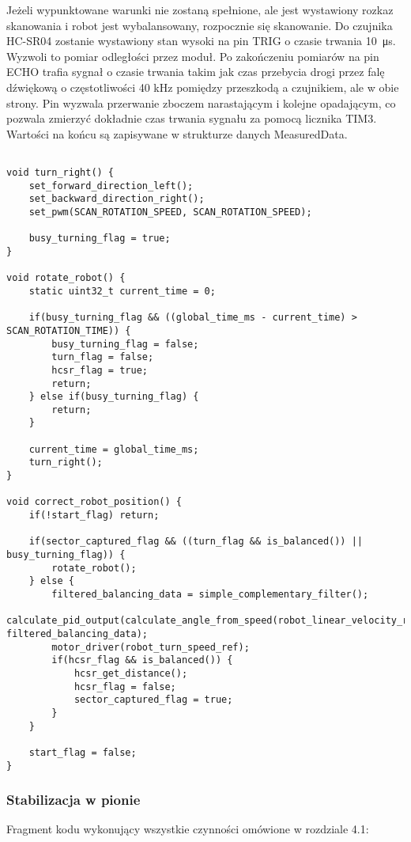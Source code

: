 \documentclass[a4paper,12pt,twoside,openany]{report}
\begin{document}
Jeżeli wypunktowane warunki nie zostaną spełnione, ale jest wystawiony rozkaz skanowania i robot jest wybalansowany, rozpocznie się skanowanie. Do czujnika HC-SR04 zostanie wystawiony stan wysoki na pin TRIG o czasie trwania \SI{10}{\micro s}. Wyzwoli to pomiar odległości przez moduł. Po zakończeniu pomiarów na pin ECHO trafia sygnał o czasie trwania takim jak czas przebycia drogi przez falę dźwiękową o częstotliwości 40 kHz pomiędzy przeszkodą a czujnikiem, ale w obie strony. Pin wyzwala przerwanie zboczem narastającym i kolejne opadającym, co pozwala zmierzyć dokładnie czas trwania sygnału za pomocą licznika TIM3. Wartości na końcu są zapisywane w strukturze danych MeasuredData.

\begin{lstlisting}[style=customc]

void turn_right() {
	set_forward_direction_left();
	set_backward_direction_right();
	set_pwm(SCAN_ROTATION_SPEED, SCAN_ROTATION_SPEED);

	busy_turning_flag = true;
}

void rotate_robot() {
	static uint32_t current_time = 0;

	if(busy_turning_flag && ((global_time_ms - current_time) > SCAN_ROTATION_TIME)) {
		busy_turning_flag = false;
		turn_flag = false;
		hcsr_flag = true;
		return;
	} else if(busy_turning_flag) {
		return;
	}

	current_time = global_time_ms;
	turn_right();
}

void correct_robot_position() {
	if(!start_flag) return;
	
	if(sector_captured_flag && ((turn_flag && is_balanced()) || busy_turning_flag)) {
		rotate_robot();
	} else {
		filtered_balancing_data = simple_complementary_filter();
		calculate_pid_output(calculate_angle_from_speed(robot_linear_velocity_ref), filtered_balancing_data);
		motor_driver(robot_turn_speed_ref);
		if(hcsr_flag && is_balanced()) {
			hcsr_get_distance();
			hcsr_flag = false;
			sector_captured_flag = true;
		}
	}

	start_flag = false;
}

\end{lstlisting}

\subsubsection{Stabilizacja w pionie}

\noindent Fragment kodu wykonujący wszystkie czynności omówione w rozdziale 4.1:
\end{document}
